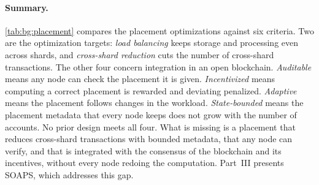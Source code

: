 \paragraph{Summary.}
\autoref{tab:bg:placement} compares the placement optimizations against six criteria.
Two are the optimization targets: \emph{load balancing} keeps storage and processing even across shards, and \emph{cross-shard reduction} cuts the number of cross-shard transactions.
The other four concern integration in an open blockchain.
\emph{Auditable} means any node can check the placement it is given.
\emph{Incentivized} means computing a correct placement is rewarded and deviating penalized.
\emph{Adaptive} means the placement follows changes in the workload.
\emph{State-bounded} means the placement metadata that every node keeps does not grow with the number of accounts. 
No prior design meets all four.
What is missing is a placement that reduces cross-shard transactions with bounded metadata, that any node can verify, and that is integrated with the consensus of the blockchain and its incentives, without every node redoing the computation.
Part~III presents SOAPS, which addresses this gap.

